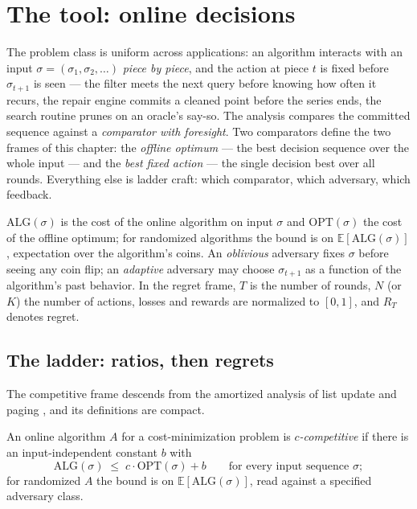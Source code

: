 \section{The tool: online decisions}
\label{sec:onl-tool}

The problem class is uniform across applications: an algorithm interacts with an input
$\sigma = (\sigma_1, \sigma_2, \dots)$ \emph{piece by piece}, and the action at piece $t$
is fixed before $\sigma_{t+1}$ is seen --- the filter meets the next query before knowing
how often it recurs, the repair engine commits a cleaned point before the series ends,
the search routine prunes on an oracle's say-so. The analysis compares the committed
sequence against a \emph{comparator with foresight}. Two comparators define the two
frames of this chapter: the \emph{offline optimum} --- the best decision sequence over
the whole input --- and the \emph{best fixed action} --- the single decision best over
all rounds. Everything else is ladder craft: which comparator, which adversary, which
feedback.

\begin{remarkbox}[Notation]
$\mathrm{ALG}(\sigma)$ is the cost of the online algorithm on input $\sigma$ and
$\mathrm{OPT}(\sigma)$ the cost of the offline optimum; for randomized algorithms the
bound is on $\mathbb{E}[\mathrm{ALG}(\sigma)]$, expectation over the algorithm's coins.
An \emph{oblivious} adversary fixes $\sigma$ before seeing any coin flip; an
\emph{adaptive} adversary may choose $\sigma_{t+1}$ as a function of the algorithm's
past behavior. In the regret frame, $T$ is the number of rounds, $N$ (or $K$) the number
of actions, losses and rewards are normalized to $[0,1]$, and $R_T$ denotes regret.
\end{remarkbox}

\subsection{The ladder: ratios, then regrets}
\label{sec:onl-ladder}

The competitive frame descends from the amortized analysis of list update and paging
\citep{online-decisions-bg1}, and its definitions are compact.

\begin{definition}\label{def:onl-cr}
An online algorithm $A$ for a cost-minimization problem is \emph{$c$-competitive} if
there is an input-independent constant $b$ with
\[
\mathrm{ALG}(\sigma) \;\le\; c\cdot\mathrm{OPT}(\sigma) + b
\qquad\text{for every input sequence }\sigma;
\]
for randomized $A$ the bound is on $\mathbb{E}[\mathrm{ALG}(\sigma)]$, read against a
specified adversary class.
\end{definition}

